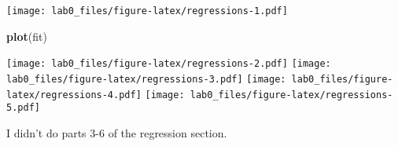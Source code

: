 \documentclass[]{article}
\newenvironment{Shaded}{\begin{snugshade}}{\end{snugshade}}
\newcommand{\KeywordTok}[1]{\textcolor[rgb]{0.13,0.29,0.53}{\textbf{{#1}}}}
\newcommand{\NormalTok}[1]{{#1}}
\begin{document}
\texttt{[image: lab0\_files/figure-latex/regressions-1.pdf]}

\begin{Shaded}
\begin{Highlighting}[]
\KeywordTok{plot}\NormalTok{(fit)}
\end{Highlighting}
\end{Shaded}

\texttt{[image: lab0\_files/figure-latex/regressions-2.pdf]}
\texttt{[image: lab0\_files/figure-latex/regressions-3.pdf]}
\texttt{[image: lab0\_files/figure-latex/regressions-4.pdf]}
\texttt{[image: lab0\_files/figure-latex/regressions-5.pdf]}

I didn't do parts 3-6 of the regression section.
\end{document}
